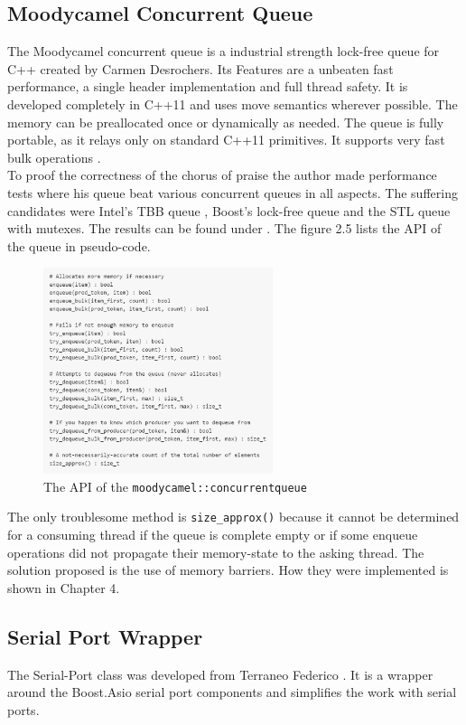 \subsection{Moodycamel Concurrent Queue}
The Moodycamel concurrent queue is a industrial strength lock-free queue for C++ created by Carmen Desrochers. Its Features are a unbeaten fast performance, a single header implementation and full thread safety. It is developed completely in C++11 and uses move semantics wherever possible. The memory can be preallocated once or dynamically as needed. The queue is fully portable, as it relays only on standard C++11 primitives. It supports very fast bulk operations \cite{moody}.\\
To proof the correctness of the chorus of praise the author made performance tests where his queue beat various concurrent queues in all aspects. The suffering candidates were Intel's TBB queue \cite{intel_tbb}, Boost's lock-free queue and the STL queue with mutexes. The results can be found under \cite{benchmark}. The figure 2.5 lists the API of the queue in pseudo-code.
\begin{figure}[h]
\centering
      \includegraphics[width=0.6\textwidth]{moody}
        \caption{The API of the \texttt{moodycamel::concurrentqueue}}
\end{figure}
The only troublesome method is \texttt{size\_approx()} because it cannot be determined for a consuming thread if the queue is complete empty or if some enqueue operations did not propagate their memory-state to the asking thread. The solution proposed is the use of memory barriers. How they were implemented is shown in Chapter 4.
\subsection{Serial Port Wrapper}
The Serial-Port class was developed from Terraneo Federico \cite{serport}. It is a wrapper around the Boost.Asio serial port components and simplifies the work with serial ports. 